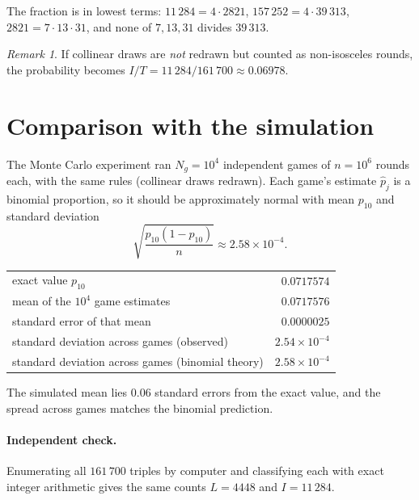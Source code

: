 \documentclass[11pt,a4paper]{article}
\theoremstyle{remark}
\newtheorem*{remark}{Remark}
\begin{document}
The fraction is in lowest terms: $11\,284=4\cdot2821$, $157\,252=4\cdot39\,313$,
$2821=7\cdot13\cdot31$, and none of $7,13,31$ divides $39\,313$.

\begin{remark}
If collinear draws are \emph{not} redrawn but counted as non-isosceles rounds, the
probability becomes $I/T=11\,284/161\,700\approx0.06978$.
\end{remark}

\section{Comparison with the simulation}

The Monte Carlo experiment ran $N_g=10^4$ independent games of $n=10^6$ rounds
each, with the same rules (collinear draws redrawn). Each game's estimate $\hat
p_j$ is a binomial proportion, so it should be approximately normal with mean
$p_{10}$ and standard deviation
\[
  \sqrt{\frac{p_{10}(1-p_{10})}{n}}\approx 2.58\times10^{-4}.
\]
\begin{center}
\begin{tabular}{lr}
\toprule
exact value $p_{10}$ & $0.0717574$ \\
mean of the $10^4$ game estimates & $0.0717576$ \\
standard error of that mean & $0.0000025$ \\
standard deviation across games (observed) & $2.54\times10^{-4}$ \\
standard deviation across games (binomial theory) & $2.58\times10^{-4}$ \\
\bottomrule
\end{tabular}
\end{center}
The simulated mean lies $0.06$ standard errors from the exact value, and the
spread across games matches the binomial prediction.

\paragraph{Independent check.} Enumerating all $161\,700$ triples by computer and
classifying each with exact integer arithmetic gives the same counts
$L=4448$ and $I=11\,284$.
\end{document}
